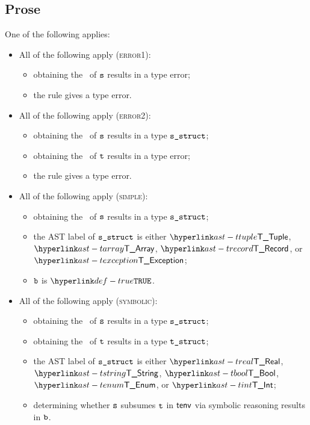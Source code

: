 \subsection{Prose}
One of the following applies:
\begin{itemize}
  \item All of the following apply (\textsc{error1}):
  \begin{itemize}
    \item obtaining the \structure\ of $\texttt{s}$ results in a type error;
    \item the rule gives a type error.
  \end{itemize}

  \item All of the following apply (\textsc{error2}):
  \begin{itemize}
    \item obtaining the \structure\ of $\texttt{s}$ results in a type $\texttt{s\_struct}$;
    \item obtaining the \structure\ of $\texttt{t}$ results in a type error;
    \item the rule gives a type error.
  \end{itemize}

  \item All of the following apply (\textsc{simple}):
  \begin{itemize}
    \item obtaining the \structure\ of $\texttt{s}$ results in a type $\texttt{s\_struct}$;
    \item the AST label of $\texttt{s\_struct}$ is either $\TTuple$, $\TArray$, $\TRecord$, or $\TException$;
    \item $\texttt{b}$ is $\True$.
  \end{itemize}

  \item All of the following apply (\textsc{symbolic}):
  \begin{itemize}
    \item obtaining the \structure\ of $\texttt{s}$ results in a type $\texttt{s\_struct}$;
    \item obtaining the \structure\ of $\texttt{t}$ results in a type $\texttt{t\_struct}$;
    \item the AST label of $\texttt{s\_struct}$ is either $\TReal$, $\TString$, $\TBool$, $\TEnum$, or $\TInt$;
    \item determining whether $\texttt{s}$ subsumes $\texttt{t}$ in $\textsf{tenv}$ via symbolic reasoning results in $\texttt{b}$.
  \end{itemize}
\end{itemize}

